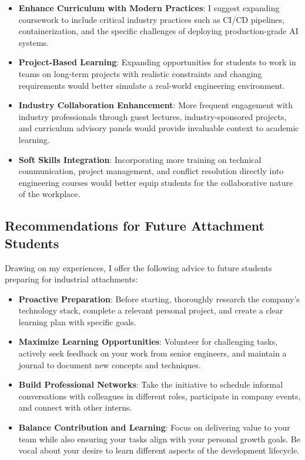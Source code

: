 \documentclass[12pt,a4paper]{article}
\begin{document}
\begin{itemize}
    \item \textbf{Enhance Curriculum with Modern Practices}: I suggest expanding coursework to include critical industry practices such as CI/CD pipelines, containerization, and the specific challenges of deploying production-grade AI systems.
    
    \item \textbf{Project-Based Learning}: Expanding opportunities for students to work in teams on long-term projects with realistic constraints and changing requirements would better simulate a real-world engineering environment.
    
    \item \textbf{Industry Collaboration Enhancement}: More frequent engagement with industry professionals through guest lectures, industry-sponsored projects, and curriculum advisory panels would provide invaluable context to academic learning.
    
    \item \textbf{Soft Skills Integration}: Incorporating more training on technical communication, project management, and conflict resolution directly into engineering courses would better equip students for the collaborative nature of the workplace.
\end{itemize}

\subsection{Recommendations for Future Attachment Students}

Drawing on my experiences, I offer the following advice to future students preparing for industrial attachments:

\begin{itemize}
    \item \textbf{Proactive Preparation}: Before starting, thoroughly research the company's technology stack, complete a relevant personal project, and create a clear learning plan with specific goals.
    
    \item \textbf{Maximize Learning Opportunities}: Volunteer for challenging tasks, actively seek feedback on your work from senior engineers, and maintain a journal to document new concepts and techniques.
    
    \item \textbf{Build Professional Networks}: Take the initiative to schedule informal conversations with colleagues in different roles, participate in company events, and connect with other interns.
    
    \item \textbf{Balance Contribution and Learning}: Focus on delivering value to your team while also ensuring your tasks align with your personal growth goals. Be vocal about your desire to learn different aspects of the development lifecycle.
\end{itemize}
\end{document}
